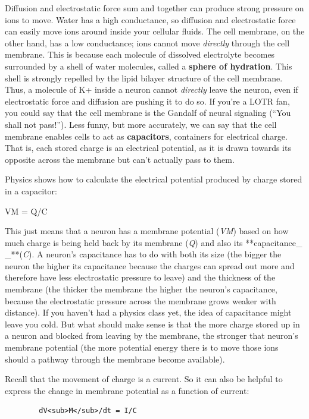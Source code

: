 \documentclass[
]{book}
\begin{document}
Diffusion and electrostatic force sum and together can produce strong pressure on ions to move. Water has a high conductance, so diffusion and electrostatic force can easily move ions around inside your cellular fluids. The cell membrane, on the other hand, has a low conductance; ions cannot move \emph{directly} through the cell membrane. This is because each molecule of dissolved electrolyte becomes surrounded by a shell of water molecules, called a \textbf{sphere of hydration}. This shell is strongly repelled by the lipid bilayer structure of the cell membrane. Thus, a molecule of K+ inside a neuron cannot \emph{directly} leave the neuron, even if electrostatic force and diffusion are pushing it to do so. If you're a LOTR fan, you could say that the cell membrane is the Gandalf of neural signaling (``You shall not pass!''). Less funny, but more accurately, we can say that the cell membrane enables cells to act as \textbf{capacitors}, containers for electrical charge. That is, each stored charge is an electrical potential, as it is drawn towards its opposite across the membrane but can't actually pass to them.

Physics shows how to calculate the electrical potential produced by charge stored in a capacitor:

VM = Q/C

This just means that a neuron has a membrane potential (\emph{VM}) based on how much charge is being held back by its membrane (\emph{Q}) and also its **capacitance\_ \_**(\emph{C}). A neuron's capacitance has to do with both its size (the bigger the neuron the higher its capacitance because the charges can spread out more and therefore have less electrostatic pressure to leave) and the thickness of the membrane (the thicker the membrane the higher the neuron's capacitance, because the electrostatic pressure across the membrane grows weaker with distance). If you haven't had a physics class yet, the idea of capacitance might leave you cold. But what should make sense is that the more charge stored up in a neuron and blocked from leaving by the membrane, the stronger that neuron's membrane potential (the more potential energy there is to move those ions should a pathway through the membrane become available).

Recall that the movement of charge is a current. So it can also be helpful to express the change in membrane potential as a function of current:

\begin{verbatim}
        dV<sub>M</sub>/dt = I/C
\end{verbatim}
\end{document}
